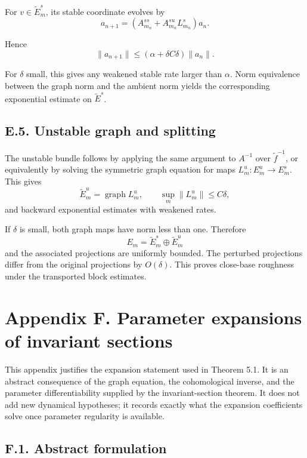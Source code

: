\documentclass[12pt,a4paper]{article}
\theoremstyle{plain}
\numberwithin{equation}{section}
\numberwithin{theorem}{section}
\begin{document}
For $v\in\widetilde E_m^s$, its stable coordinate evolves by
\[
a_{n+1}=(A_{m_n}^{ss}+A_{m_n}^{su}L_{m_n}^s)a_n.
\]

Hence
\[
\|a_{n+1}\|
\le
(\alpha+
\delta C\delta)
\|a_n\|.
\]

For $\delta$ small, this gives any weakened stable rate larger than $\alpha$. Norm equivalence between the graph norm and the ambient norm yields the corresponding exponential estimate on $\widetilde E^s$.

\subsection{E.5. Unstable graph and splitting}

The unstable bundle follows by applying the same argument to $A^{-1}$ over $\widetilde f^{-1}$, or equivalently by solving the symmetric graph equation for maps $L_m^u:E_m^u\to E_m^s$. This gives
\[
\widetilde E_m^u=
\operatorname{graph}L_m^u,
\qquad
\sup_m\|L_m^u\|\le C\delta,
\]
and backward exponential estimates with weakened rates.

If $\delta$ is small, both graph maps have norm less than one. Therefore
\[
E_m=
\widetilde E_m^s\oplus\widetilde E_m^u
\]
and the associated projections are uniformly bounded. The perturbed projections differ from the original projections by $O(\delta)$. This proves close-base roughness under the transported block estimates.

\clearpage

\section{Appendix F. Parameter expansions of invariant sections}

This appendix justifies the expansion statement used in Theorem 5.1. It is an abstract consequence of the graph equation, the cohomological inverse, and the parameter differentiability supplied by the invariant-section theorem. It does not add new dynamical hypotheses; it records exactly what the expansion coefficients solve once parameter regularity is available.

\subsection{F.1. Abstract formulation}
\end{document}
